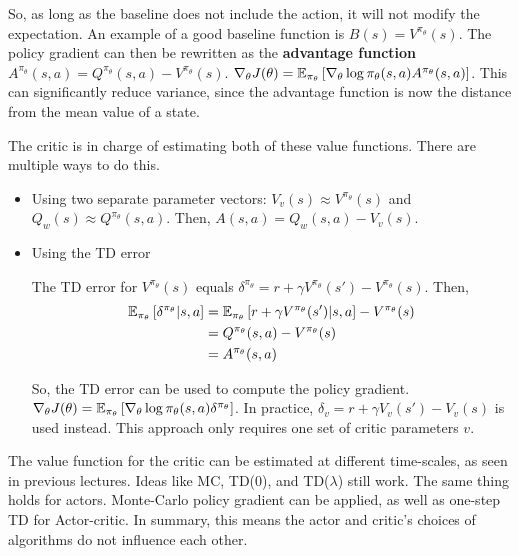 So, as long as the baseline does not include the action, it will not modify the expectation. An example of a good baseline function is $B(s) = V^{\pi_\theta}(s)$. The policy gradient can then be rewritten as the \textbf{advantage function} $A^{\pi_\theta}(s, a) = Q^{\pi_\theta}(s, a) - V^{\pi_\theta}(s)$. $\nabla_\theta J(\theta) = \operatorname{\mathbb{E}}_{\pi_\theta} \left[\nabla_\theta \log \pi_\theta(s, a)A^{\pi_\theta}(s, a)\right]$. This can significantly reduce variance, since the advantage function is now the distance from the mean value of a state.

The critic is in charge of estimating both of these value functions. There are multiple ways to do this.
\begin{itemize}
	\item Using two separate parameter vectors: 
	$V_v(s) \approx V^{\pi_\theta}(s)$ and $Q_w(s) \approx Q^{\pi_\theta}(s, a)$. Then, $A(s, a) = Q_w(s, a) - V_v(s)$.
	\item Using the TD error
	
	The TD error for $V^{\pi_\theta}(s)$ equals $\delta^{\pi_\theta} = r + \gamma V^{\pi_\theta}(s') - V^{\pi_\theta}(s)$. Then,
	\begin{equation*}
		\begin{aligned}
			\operatorname{\mathbb{E}}_{\pi_\theta} \left[\delta^{\pi_\theta} |s, a\right] & = \operatorname{\mathbb{E}}_{\pi_\theta} \left[r + \gamma V^{\pi_\theta}(s') |s, a\right] - V^{\pi_\theta}(s)\\
			& = Q^{\pi_\theta}(s, a) - V^{\pi_\theta}(s)\\
			& = A^{\pi_\theta}(s, a)
		\end{aligned}
	\end{equation*}

	So, the TD error can be used to compute the policy gradient. $\nabla_\theta J(\theta) = \operatorname{\mathbb{E}}_{\pi_\theta} \left[\nabla_\theta \log \pi_\theta(s, a)\delta^{\pi_\theta}\right]$. In practice, $\delta_v = r + \gamma V_v(s') - V_v(s)$ is used instead. This approach only requires one set of critic parameters $v$.

\end{itemize}

The value function for the critic can be estimated at different time-scales, as seen in previous lectures. Ideas like MC, TD(0), and TD($\lambda$) still work. The same thing holds for actors. Monte-Carlo policy gradient can be applied, as well as one-step TD for Actor-critic. In summary, this means the actor and critic's choices of algorithms do not influence each other.

